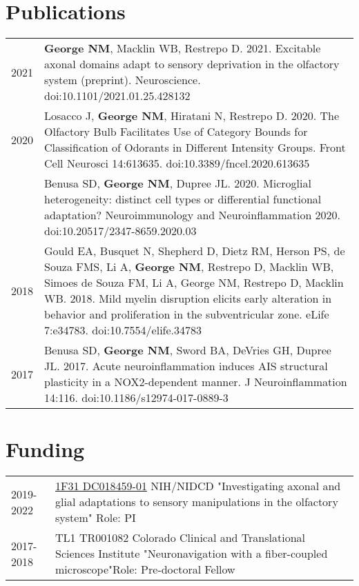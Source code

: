 \documentclass[11pt]{article}
\begin{document}
\section*{Publications}
\label{sec:org4f4e3fc}
\begin{tabular}{lp{}}
2021& \textbf{George NM}, Macklin WB, Restrepo D. 2021. Excitable axonal domains adapt to sensory deprivation in the olfactory system (preprint). Neuroscience. doi:10.1101/2021.01.25.428132\\

2020& Losacco J, \textbf{George NM}, Hiratani N, Restrepo D. 2020. The Olfactory Bulb Facilitates Use of Category Bounds for Classification of Odorants in Different Intensity Groups. Front Cell Neurosci 14:613635. doi:10.3389/fncel.2020.613635\\

& Benusa SD, \textbf{George NM}, Dupree JL. 2020. Microglial heterogeneity: distinct cell types or differential functional adaptation? Neuroimmunology and Neuroinflammation 2020. doi:10.20517/2347-8659.2020.03\\

2018& Gould EA, Busquet N, Shepherd D, Dietz RM, Herson PS, de Souza FMS, Li A, \textbf{George NM}, Restrepo D, Macklin WB, Simoes de Souza FM, Li A, George NM, Restrepo D, Macklin WB. 2018. Mild myelin disruption elicits early alteration in behavior and proliferation in the subventricular zone. eLife 7:e34783. doi:10.7554/elife.34783\\

2017& Benusa SD, \textbf{George NM}, Sword BA, DeVries GH, Dupree JL. 2017. Acute neuroinflammation induces AIS structural plasticity in a NOX2-dependent manner. J Neuroinflammation 14:116. doi:10.1186/s12974-017-0889-3\\

\end{tabular}
\section*{Funding}
\label{sec:orgb547a3c}
\begin{tabular}{lp{}}
2019-2022& \href{https://projectreporter.nih.gov/project_info_details.cfm?aid=9909888&icde=50328886&ddparam=&ddvalue=&ddsub=&cr=1&csb=default&cs=ASC&pball=}{1F31 DC018459-01} \newline NIH/NIDCD \newline "Investigating axonal and glial adaptations to sensory manipulations in the olfactory system" \newline Role: PI \\
2017-2018& TL1 TR001082 \newline Colorado Clinical and Translational Sciences Institute \newline "Neuronavigation with a fiber-coupled microscope"\newline Role: Pre-doctoral Fellow
\end{tabular}
\end{document}
